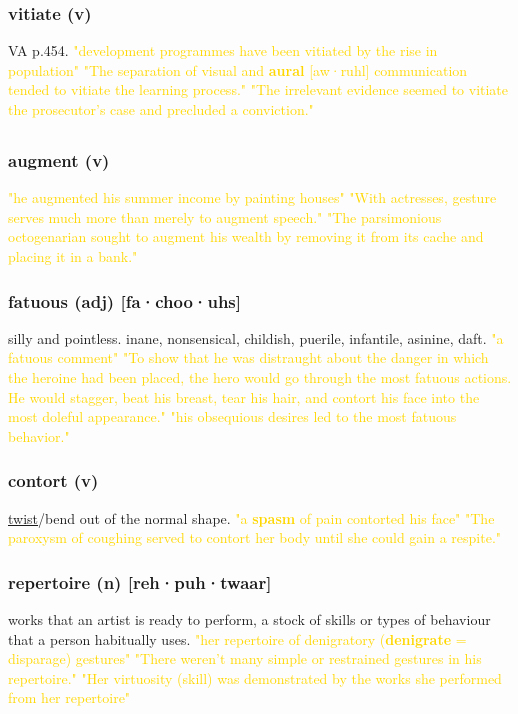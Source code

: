 \documentclass{proc}
\begin{document}
	\subsubsection{\textcolor{brickred}{vitiate} (v)}
	VA p.454.
	\textcolor{gold}{"development programmes have been vitiated by the rise in population" "The separation of visual and \textbf{aural} [aw·ruhl] communication tended to vitiate the learning process." "The irrelevant evidence seemed to vitiate the prosecutor's case and precluded a conviction."}
	
	\newpage
	\subsection{}
	\subsubsection{\textcolor{brickred}{augment} (v)}
	\textcolor{gold}{"he augmented his summer income by painting houses" "With actresses, gesture serves much more than merely to augment speech." "The parsimonious octogenarian sought to augment his wealth by removing it from its cache and placing it in a bank."}
	
	\subsubsection{\textcolor{brickred}{fatuous} (adj) [fa·choo·uhs]}
	silly and pointless. inane, nonsensical,
	childish,
	puerile,
	infantile,
	asinine,
	daft.
	\textcolor{gold}{"a fatuous comment" "To show that he was distraught about the danger in which the heroine had been placed, the hero would go through the most fatuous actions. He would stagger, beat his breast, tear his hair, and contort his face into the most  doleful appearance." "his obsequious desires led to the most fatuous behavior."}
	
	\subsubsection{\textcolor{brickred}{contort} (v)}
	\underline{twist}/bend out of the normal shape.
	\textcolor{gold}{"a \textbf{spasm} of pain contorted his face" "The paroxysm of coughing served to contort her body until she could gain a respite."}
	
	\subsubsection{\textcolor{brickred}{repertoire} (n) [reh·puh·twaar]}
	works that an artist is ready to perform, a stock of skills or types of behaviour that a person habitually uses.
	\textcolor{gold}{"her repertoire of denigratory (\textbf{denigrate} = disparage) gestures" "There weren't many simple or restrained gestures in his repertoire." "Her virtuosity (skill) was demonstrated by the works she performed from her repertoire"}
	
\end{document}
